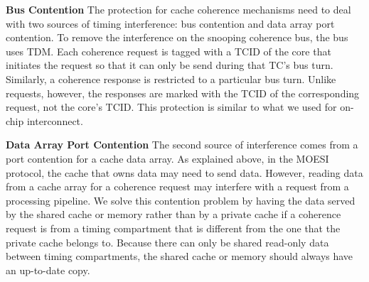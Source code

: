 {\bf Bus Contention}
The protection for cache coherence mechanisms need to deal with two sources of
timing interference: bus contention and data array port contention.
To remove the interference on the snooping coherence bus, the bus
uses TDM. Each coherence request is tagged with a TCID of the core that
initiates the request so that it can only be send during that TC's bus turn.
Similarly, a coherence response is restricted to a particular bus turn.
Unlike requests, however, the responses are marked with the TCID of the
corresponding request, not the core's TCID.
This protection is similar to what we used for on-chip interconnect. 

{\bf Data Array Port Contention}
The second source of interference comes from a port contention for a cache
data array. As explained above, in the MOESI protocol, the cache that owns 
data may need to send data. However, reading data from a cache array for
a coherence request may interfere with a request from a processing pipeline.
We solve this contention problem by having the data served by the shared
cache or memory rather than by a private cache if a
coherence request is from a timing compartment that is different from
the one that the private cache belongs to.
Because there can only be shared read-only data between timing compartments,
the shared cache or memory should always have an up-to-date copy.

 
